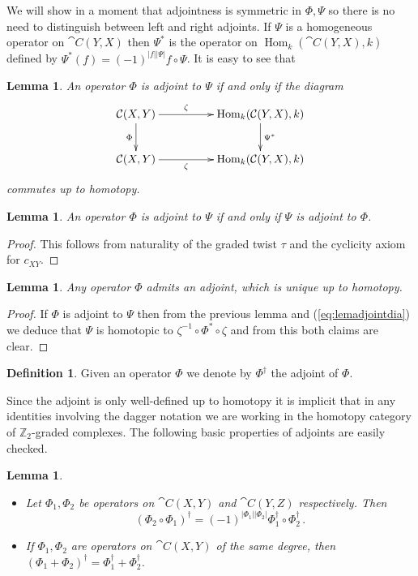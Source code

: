 \documentclass{compositio}
\newtheorem{lemma}[theorem]{Lemma}
\theoremstyle{definition}
\newtheorem{definition}[theorem]{Definition}
\numberwithin{equation}{section}
\def\Hom{\operatorname{Hom}}
\begin{document}
We will show in a moment that adjointness is symmetric in $\Phi, \Psi$ so there is no need to distinguish between left and right adjoints. If $\Psi$ is a homogeneous operator on $\cat{C}(Y,X)$ then $\Psi^*$ is the operator on $\Hom_k(\cat{C}(Y,X),k)$ defined by $\Psi^*(f) = (-1)^{|f||\Psi|} f \circ \Psi$. It is easy to see that

\begin{lemma} An operator $\Phi$ is adjoint to $\Psi$ if and only if the diagram
\begin{equation}\label{eq:lemadjointdia}
\xymatrix@C+2pc{
\cat{C}(X,Y) \ar[d]_\Phi \ar[r]^-{\zeta} & \Hom_k( \cat{C}(Y,X), k ) \ar[d]^{\Psi^*}\\
\cat{C}(X,Y) \ar[r]_-{\zeta} & \Hom_k( \cat{C}(Y,X), k)
}
\end{equation}
commutes up to homotopy.
\end{lemma}

\begin{lemma} An operator $\Phi$ is adjoint to $\Psi$ if and only if $\Psi$ is adjoint to $\Phi$.
\end{lemma}
\begin{proof}
This follows from naturality of the graded twist $\tau$ and the cyclicity axiom for $c_{XY}$.
\end{proof}

\begin{lemma} Any operator $\Phi$ admits an adjoint, which is unique up to homotopy. 
\end{lemma}
\begin{proof}
If $\Phi$ is adjoint to $\Psi$ then from the previous lemma and (\ref{eq:lemadjointdia}) we deduce that $\Psi$ is homotopic to $\zeta^{-1} \circ \Phi^* \circ \zeta$ and from this both claims are clear.
\end{proof}

\begin{definition} Given an operator $\Phi$ we denote by $\Phi^{\dagger}$ the adjoint of $\Phi$.
\end{definition}

Since the adjoint is only well-defined up to homotopy it is implicit that in any identities involving the dagger notation we are working in the homotopy category of $\mathbb{Z}_2$-graded complexes. The following basic properties of adjoints are easily checked.

\begin{lemma} 
\begin{itemize}
\item[(i)] Let $\Phi_1, \Phi_2$ be operators on $\cat{C}(X,Y)$ and $\cat{C}(Y,Z)$ respectively. Then
\[
(\Phi_2 \circ \Phi_1)^{\dagger} = (-1)^{|\Phi_1||\Phi_2|} \Phi_1^{\dagger} \circ \Phi_2^{\dagger}\,.
\]
\item[(ii)] If $\Phi_1, \Phi_2$ are operators on $\cat{C}(X,Y)$ of the same degree, then $(\Phi_1 + \Phi_2)^{\dagger} = \Phi_1^{\dagger} + \Phi_2^{\dagger}$.
\end{itemize}
\end{lemma}
\end{document}
